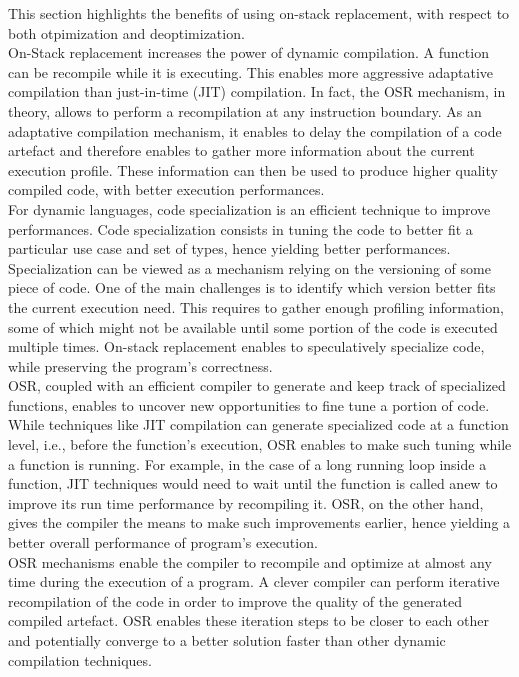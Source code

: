 This section highlights the benefits of using on-stack replacement, with respect to both otpimization and deoptimization.\\

On-Stack replacement increases the power of dynamic compilation.
A function can be recompile while it is executing.
This enables more aggressive adaptative compilation than just-in-time (JIT) compilation.
In fact, the OSR mechanism, in theory, allows to perform a recompilation at any instruction boundary. 
As an adaptative compilation mechanism, it enables to delay the compilation of a code artefact and therefore enables to gather more information about the current execution profile.
These information can then be used to produce higher quality compiled code, with better execution performances.\\

For dynamic languages, code specialization is an efficient technique to improve performances\cite{gal2009trace}.
Code specialization consists in tuning the code to better fit a particular use case and set of types, hence yielding better performances.
Specialization can be viewed as a mechanism relying on the versioning of some piece of code.
One of the main challenges is to identify which version better fits the current execution need.
This requires to gather enough profiling information, some of which might not be available until some portion of the code is executed multiple times.
On-stack replacement enables to speculatively specialize code, while preserving the program's correctness.\\

OSR, coupled with an efficient compiler to generate and keep track of specialized functions, enables to uncover new opportunities to fine tune a portion of code.
While techniques like JIT compilation can generate specialized code at a function level, i.e., before the function's execution, OSR enables to make such tuning while a function is running.
For example, in the case of a long running loop inside a function, JIT techniques would need to wait until the function is called anew to improve its run time performance by recompiling it. 
OSR, on the other hand, gives the compiler the means to make such improvements earlier, hence yielding a better overall performance of program's execution.\\

OSR mechanisms enable the compiler to recompile and optimize at almost any time during the execution of a program.
A clever compiler can perform iterative recompilation of the code in order to improve the quality of the generated compiled artefact.
OSR enables these iteration steps to be closer to each other and potentially converge to a better solution faster than other dynamic compilation techniques.\\

